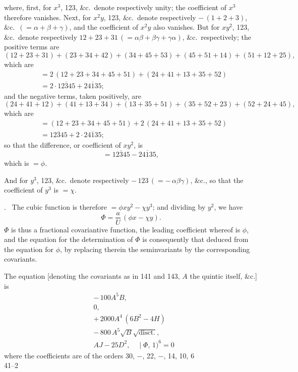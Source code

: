 \documentclass[11pt]{article}
\newcommand{\Cdel}{\mid}
\begin{document}
\medskip

\noindent where, first, for $x^3$, 123, \&c.\ denote respectively unity; the coefficient of $x^3$ therefore vanishes. Next, for $x^2 y$, 123, \&c.\ denote respectively $-\,(1 + 2 + 3)$, \&c.\ $(= \alpha + \beta + \gamma)$, and the coefficient of $x^2 y$ also vanishes. But for $x y^2$, 123, \&c.\ denote respectively $12 + 23 + 31\,(= \alpha\beta + \beta\gamma + \gamma\alpha)$, \&c.\ respectively; the positive terms are
\[
   (12 + 23 + 31) + (23 + 34 + 42) + (34 + 45 + 53) + (45 + 51 + 14) + (51 + 12 + 25),
\]
which are
\[
\begin{aligned}
   &= 2\,(12 + 23 + 34 + 45 + 51) + (24 + 41 + 13 + 35 + 52)\\
   &= 2\cdot\overline{12345} + \overline{24135};
\end{aligned}
\]
and the negative terms, taken positively, are
\[
   (24 + 41 + 12) + (41 + 13 + 34) + (13 + 35 + 51) + (35 + 52 + 23) + (52 + 24 + 45),
\]
which are
\[
\begin{aligned}
   &= (12 + 23 + 34 + 45 + 51) + 2\,(24 + 41 + 13 + 35 + 52)\\
   &= \overline{12345} + 2\cdot\overline{24135};
\end{aligned}
\]
so that the difference, or coefficient of $x y^2$, is
\[
   = \overline{12345} - \overline{24135},
\]
which is $= \phi$.

\medskip

\noindent And for $y^3$, 123, \&c.\ denote respectively $-\,123\,(= -\,\alpha\beta\gamma)$, \&c., so that the coefficient of $y^3$ is $= \chi$.

\medskip

. \ The cubic function is therefore $= \phi x y^2 - \chi y^3$; and dividing by $y^2$, we have
\[
   \Phi = \frac{a}{U}\,(\phi x - \chi y).
\]
$\Phi$ is thus a fractional covariantive function, the leading coefficient whereof is $\phi$, and the equation for the determination of $\Phi$ is consequently that deduced from the equation for $\phi$, by replacing therein the seminvariants by the corresponding covariants.

\medskip

\noindent The equation [denoting the covariants as in 141 and 143, $A$ the quintic itself, \&c.] is
\[
\begin{aligned}
   &-\,100 A^5 B,\\
   &0,\\
   &+\,2000 A^4\,(6 B^2 - 4 H)\\
   &-\,800\,A^5\sqrt{B}\sqrt{\text{disct.}},\\
   &A J - 25 D^2,\quad\Cdel\Phi,\,1)^6 = 0
\end{aligned}
\]
where the coefficients are of the orders 30, $-$, 22, $-$, 14, 10, 6\\
\hfill 41--2
\end{document}
